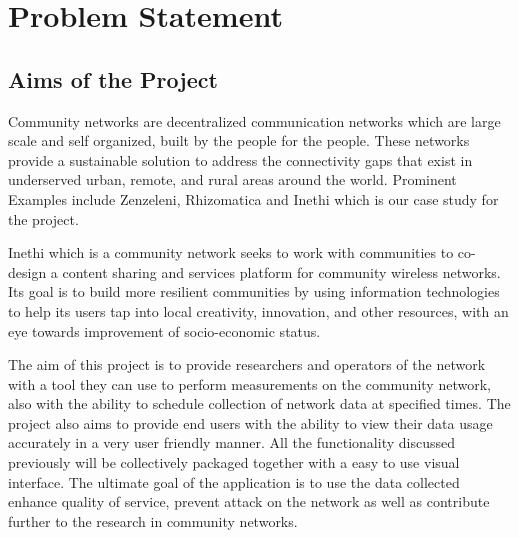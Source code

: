 \section{Problem Statement}
\subsection{Aims of the Project}
Community networks are decentralized communication networks which are large scale and self organized, built by the people for the people\cite{Braem:2013:CRC:2500098.2500108}. These networks provide a sustainable solution to address the connectivity gaps that exist in underserved urban, remote, and rural areas around the world\cite{Braem:2015:AEQ:2830629.2830639}. Prominent Examples include Zenzeleni, Rhizomatica and Inethi which is our case study for the project.  

Inethi which is a community network seeks to work with communities to co-design a content sharing and services platform for community wireless networks\cite{inethi}. Its goal is to build more resilient communities by using information technologies to help its users tap into local creativity, innovation, and other resources, with an eye towards improvement of socio-economic status\cite{inethi}.

The aim of this project is to provide researchers and operators of the network with a tool they can use to perform measurements on the community network, also with the ability to schedule collection of network data at specified times. The project also aims to provide end users with the ability to view their data usage accurately in a very user friendly manner. All the functionality discussed previously will be collectively packaged together with a easy to use visual interface. The ultimate goal of the application is to use the data collected enhance quality of service, prevent attack on the network as well as contribute further to the research in community networks.
